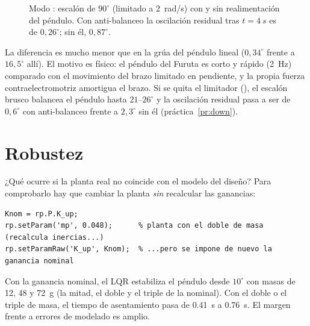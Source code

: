 \begin{figure}[H]
\centering
{}
\caption{Modo : escalón de $90^\circ$ (limitado a \SI{2}{rad/s}) con y sin realimentación del péndulo. Con anti-balanceo la oscilación residual tras $t=\SI{4}{s}$ es de $0{,}26^\circ$; sin él, $0{,}87^\circ$.}
\label{fig:down}
\end{figure}

La diferencia es mucho menor que en la grúa del péndulo lineal ($0{,}34^\circ$ frente a $16{,}5^\circ$ allí). El motivo es físico: el péndulo del Furuta es corto y rápido (\SI{2}{Hz}) comparado con el movimiento del brazo limitado en pendiente, y la propia fuerza contraelectromotriz amortigua el brazo. Si se quita el limitador (), el escalón brusco balancea el péndulo hasta $21$--$26^\circ$ y la oscilación residual pasa a ser de $0{,}6^\circ$ con anti-balanceo frente a $2{,}3^\circ$ sin él (práctica~\ref{pr:down}).

\section{Robustez}
\label{sec:robustez}

¿Qué ocurre si la planta real no coincide con el modelo del diseño? Para comprobarlo hay que cambiar la planta \emph{sin} recalcular las ganancias:
\begin{lstlisting}
Knom = rp.P.K_up;
rp.setParam('mp', 0.048);      % planta con el doble de masa (recalcula inercias...)
rp.setParamRaw('K_up', Knom);  % ...pero se impone de nuevo la ganancia nominal
\end{lstlisting}
Con la ganancia nominal, el LQR estabiliza el péndulo desde $10^\circ$ con masas de 12, 48 y \SI{72}{g} (la mitad, el doble y el triple de la nominal). Con el doble o el triple de masa, el tiempo de asentamiento pasa de \SI{0.41}{s} a \SI{0.76}{s}. El margen frente a errores de modelado es amplio.


